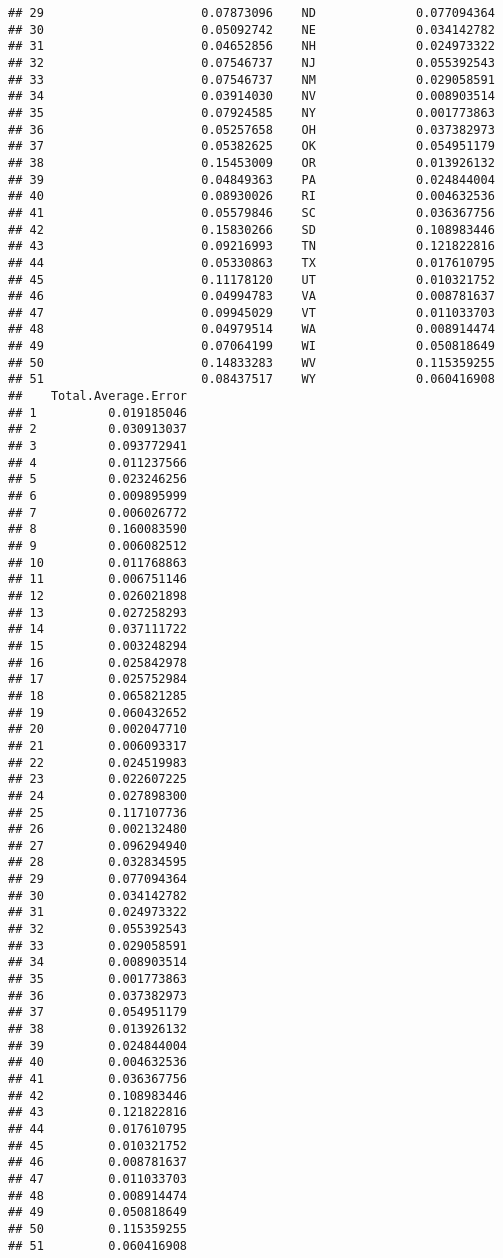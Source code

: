 \documentclass{article}\usepackage[]{graphicx}\usepackage[]{color}
\makeatletter
\newenvironment{kframe}{%
 \def\at@end@of@kframe{}%
 \ifinner\ifhmode%
  \def\at@end@of@kframe{\end{minipage}}%
  \begin{minipage}{\columnwidth}%
 \fi\fi%
 \def\FrameCommand##1{\hskip\@totalleftmargin \hskip-\fboxsep
 \colorbox{shadecolor}{##1}\hskip-\fboxsep
     \hskip-\linewidth \hskip-\@totalleftmargin \hskip\columnwidth}%
 \MakeFramed {\advance\hsize-\width
   \@totalleftmargin\z@ \linewidth\hsize
   \@setminipage}}%
 {\par\unskip\endMakeFramed%
 \at@end@of@kframe}
\newenvironment{knitrout}{}{} %
\makeatother
\begin{document}
\begin{knitrout}
\begin{kframe}
\begin{verbatim}
## 29                      0.07873096    ND              0.077094364
## 30                      0.05092742    NE              0.034142782
## 31                      0.04652856    NH              0.024973322
## 32                      0.07546737    NJ              0.055392543
## 33                      0.07546737    NM              0.029058591
## 34                      0.03914030    NV              0.008903514
## 35                      0.07924585    NY              0.001773863
## 36                      0.05257658    OH              0.037382973
## 37                      0.05382625    OK              0.054951179
## 38                      0.15453009    OR              0.013926132
## 39                      0.04849363    PA              0.024844004
## 40                      0.08930026    RI              0.004632536
## 41                      0.05579846    SC              0.036367756
## 42                      0.15830266    SD              0.108983446
## 43                      0.09216993    TN              0.121822816
## 44                      0.05330863    TX              0.017610795
## 45                      0.11178120    UT              0.010321752
## 46                      0.04994783    VA              0.008781637
## 47                      0.09945029    VT              0.011033703
## 48                      0.04979514    WA              0.008914474
## 49                      0.07064199    WI              0.050818649
## 50                      0.14833283    WV              0.115359255
## 51                      0.08437517    WY              0.060416908
##    Total.Average.Error
## 1          0.019185046
## 2          0.030913037
## 3          0.093772941
## 4          0.011237566
## 5          0.023246256
## 6          0.009895999
## 7          0.006026772
## 8          0.160083590
## 9          0.006082512
## 10         0.011768863
## 11         0.006751146
## 12         0.026021898
## 13         0.027258293
## 14         0.037111722
## 15         0.003248294
## 16         0.025842978
## 17         0.025752984
## 18         0.065821285
## 19         0.060432652
## 20         0.002047710
## 21         0.006093317
## 22         0.024519983
## 23         0.022607225
## 24         0.027898300
## 25         0.117107736
## 26         0.002132480
## 27         0.096294940
## 28         0.032834595
## 29         0.077094364
## 30         0.034142782
## 31         0.024973322
## 32         0.055392543
## 33         0.029058591
## 34         0.008903514
## 35         0.001773863
## 36         0.037382973
## 37         0.054951179
## 38         0.013926132
## 39         0.024844004
## 40         0.004632536
## 41         0.036367756
## 42         0.108983446
## 43         0.121822816
## 44         0.017610795
## 45         0.010321752
## 46         0.008781637
## 47         0.011033703
## 48         0.008914474
## 49         0.050818649
## 50         0.115359255
## 51         0.060416908
\end{verbatim}
\end{kframe}
\end{knitrout}
\end{document}

